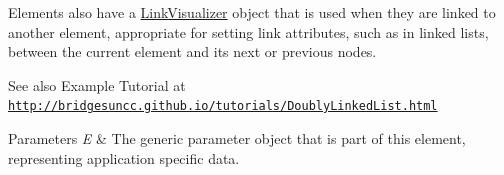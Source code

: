 Elements also have a \mbox{\hyperlink{classbridges_1_1base_1_1_link_visualizer}{Link\+Visualizer}} object that is used when they are linked to another element, appropriate for setting link attributes, such as in linked lists, between the current element and its next or previous nodes.

\begin{DoxySeeAlso}{See also}
Example Tutorial at ~\newline
 \href{http://bridgesuncc.github.io/tutorials/DoublyLinkedList.html}{\tt http\+://bridgesuncc.\+github.\+io/tutorials/\+Doubly\+Linked\+List.\+html}
\end{DoxySeeAlso}

\begin{DoxyParams}{Parameters}
{\em E} & The generic parameter object that is part of this element, representing application specific data. \\
\hline
\end{DoxyParams}
